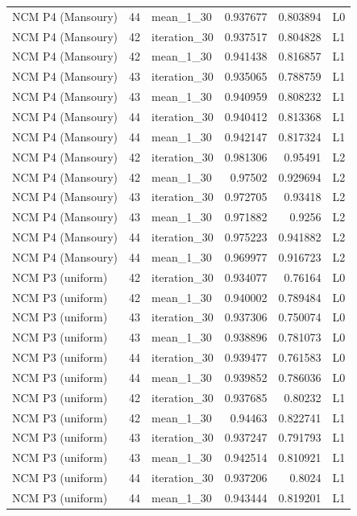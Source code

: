 \begin{table}[htbp!]
\begin{tabular}{lrlrrl}
NCM P4 (Mansoury) & 44 & mean\_1\_30 & 0.937677 & 0.803894 & L0 \\
NCM P4 (Mansoury) & 42 & iteration\_30 & 0.937517 & 0.804828 & L1 \\
NCM P4 (Mansoury) & 42 & mean\_1\_30 & 0.941438 & 0.816857 & L1 \\
NCM P4 (Mansoury) & 43 & iteration\_30 & 0.935065 & 0.788759 & L1 \\
NCM P4 (Mansoury) & 43 & mean\_1\_30 & 0.940959 & 0.808232 & L1 \\
NCM P4 (Mansoury) & 44 & iteration\_30 & 0.940412 & 0.813368 & L1 \\
NCM P4 (Mansoury) & 44 & mean\_1\_30 & 0.942147 & 0.817324 & L1 \\
NCM P4 (Mansoury) & 42 & iteration\_30 & 0.981306 & 0.95491 & L2 \\
NCM P4 (Mansoury) & 42 & mean\_1\_30 & 0.97502 & 0.929694 & L2 \\
NCM P4 (Mansoury) & 43 & iteration\_30 & 0.972705 & 0.93418 & L2 \\
NCM P4 (Mansoury) & 43 & mean\_1\_30 & 0.971882 & 0.9256 & L2 \\
NCM P4 (Mansoury) & 44 & iteration\_30 & 0.975223 & 0.941882 & L2 \\
NCM P4 (Mansoury) & 44 & mean\_1\_30 & 0.969977 & 0.916723 & L2 \\
NCM P3 (uniform) & 42 & iteration\_30 & 0.934077 & 0.76164 & L0 \\
NCM P3 (uniform) & 42 & mean\_1\_30 & 0.940002 & 0.789484 & L0 \\
NCM P3 (uniform) & 43 & iteration\_30 & 0.937306 & 0.750074 & L0 \\
NCM P3 (uniform) & 43 & mean\_1\_30 & 0.938896 & 0.781073 & L0 \\
NCM P3 (uniform) & 44 & iteration\_30 & 0.939477 & 0.761583 & L0 \\
NCM P3 (uniform) & 44 & mean\_1\_30 & 0.939852 & 0.786036 & L0 \\
NCM P3 (uniform) & 42 & iteration\_30 & 0.937685 & 0.80232 & L1 \\
NCM P3 (uniform) & 42 & mean\_1\_30 & 0.94463 & 0.822741 & L1 \\
NCM P3 (uniform) & 43 & iteration\_30 & 0.937247 & 0.791793 & L1 \\
NCM P3 (uniform) & 43 & mean\_1\_30 & 0.942514 & 0.810921 & L1 \\
NCM P3 (uniform) & 44 & iteration\_30 & 0.937206 & 0.8024 & L1 \\
NCM P3 (uniform) & 44 & mean\_1\_30 & 0.943444 & 0.819201 & L1 \\

\end{tabular}
\end{table}
